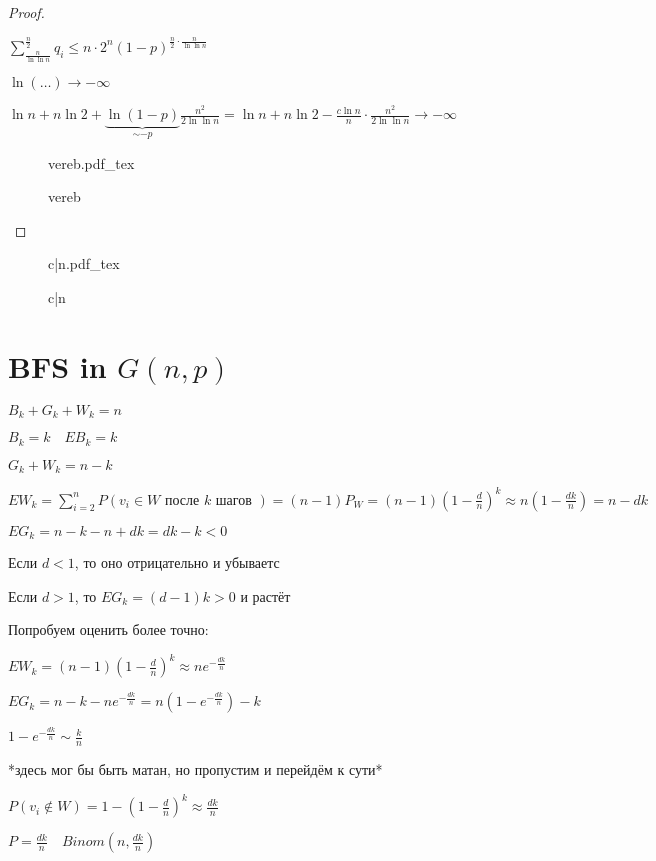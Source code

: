 \documentclass{book}
\theoremstyle{definition}
\newcommand{\incfig}[1]{%
    \def\svgwidth{\columnwidth}
    {#1.pdf_tex}
}
\begin{document}
\begin{proof}
\begin{enumerate}
             $\sum_{\frac{n}{\ln \ln n}}^{\frac{n}{2}} q_i \leqslant n\cdot 2^n(1-p)^{\frac{n}{2}\cdot \frac{n}{\ln \ln n}}$

             $\ln \left( \ldots \right) \to -\infty $

             $\ln n + n\ln 2 + \underbrace{\ln (1-p)}_{\sim -p} \frac{n^2}{2\ln \ln n} = \ln n + n\ln 2 - \frac{c\ln n}{n}\cdot \frac{n^2}{2\ln \ln n} \to -\infty $ 

\begin{figure}[!ht]
    \centering
    \incfig{vereb}
    \caption{vereb}
    \label{fig:vereb}
\end{figure}
    \end{enumerate}
\end{proof}


\begin{figure}[!ht]
    \centering
    \incfig{c|n}
    \caption{c|n}
    \label{fig:c|n}
\end{figure}

\section{BFS in $G\left( n, p \right) $}

$B_k + G_k + W_k = n$

 $B_k = k\quad EB_k = k$

  $G_k + W_k = n - k$

  $EW_k = \sum_{i=2}^{n} P\left( v_i\in W \text{ после } k \text{ шагов } \right) = (n-1)P_W = (n-1)(1-\frac{d}{n})^k \approx n\left( 1-\frac{dk}{n} \right) = n-dk $ 

  $EG_k = n - k - n + dk = dk - k < 0$

  Если  $d < 1$, то оно отрицательно и убываетс

  Если  $d > 1$, то   $EG_k = \left( d-1 \right) k >0$ и растёт

  Попробуем оценить более точно:

  $EW_k = \left( n-1 \right) \left( 1-\frac{d}{n} \right) ^k \approx ne^{-\frac{dk}{n}}$ 

  $EG_k = n - k - ne^{-\frac{dk}{n}} = n\left( 1 - e^{-\frac{dk}{n}} \right) -k$

  $1 - e^{-\frac{dk}{n}} \sim \frac{k}{n}$ 

  *здесь мог бы быть матан, но пропустим и перейдём к сути*

  $P\left( v_i\not\in W \right)  = 1 -\left( 1 - \frac{d}{n} \right) ^k \approx \frac{dk}{n}$

  $P = \frac{dk}{n}\quad Binom\left( n, \frac{dk}{n} \right) $
\end{document}
